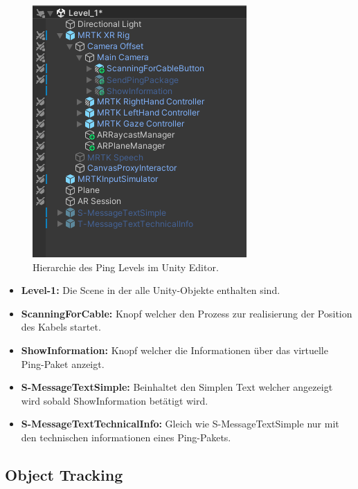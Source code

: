 \begin{figure}[h]
    \centering
    \includegraphics[scale=1]{images/Level1Hierarchy}
    \caption{Hierarchie des Ping Levels im Unity Editor.}
    \label{fig:level1_hierarchy}
\end{figure}
\begin{itemize}
    \item \textbf{Level-1:} Die Scene in der alle Unity-Objekte enthalten sind.
    \item \textbf{ScanningForCable:} Knopf welcher den Prozess zur realisierung der Position des Kabels startet.
    \item \textbf{ShowInformation:} Knopf welcher die Informationen über das virtuelle Ping-Paket anzeigt.
    \item \textbf{S-MessageTextSimple:} Beinhaltet den Simplen Text welcher angezeigt wird sobald ShowInformation betätigt wird.
    \item \textbf{S-MessageTextTechnicalInfo:} Gleich wie S-MessageTextSimple nur mit den technischen informationen eines Ping-Pakets.
\end{itemize}


\subsection{Object Tracking}
